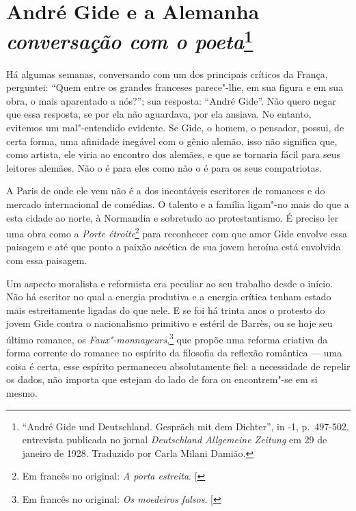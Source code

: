 \chapter*{André Gide e a Alemanha\\
\emph{conversação com o poeta}\footnote[*]{``André Gide und Deutschland. Gespräch mit dem Dichter'', in -1, p.~497-502, entrevista publicada no jornal \emph{Deutschland Allgemeine Zeitung} em 29 de janeiro de 1928. Traduzido por Carla Milani Damião.}}


Há algumas semanas, conversando com um dos principais críticos da
França, perguntei: ``Quem entre os grandes franceses parece"-lhe, em sua
figura e em sua obra, o mais aparentado a nós?''; sua resposta:
``André Gide''. Não quero negar que essa resposta, se por ela não
aguardava, por ela ansiava. No entanto, evitemos um mal"-entendido
evidente. Se Gide, o homem, o pensador, possui, de certa forma, uma
afinidade inegável com o gênio alemão, isso não significa que, como
artista, ele viria ao encontro dos alemães, e que se tornaria fácil para
seus leitores alemães. Não o é para eles como não o é para os seus
compatriotas.

A Paris de onde ele vem não é a dos incontáveis ​​escritores de romances
e do mercado internacional de comédias. O talento e a família ligam"-no
mais do que a esta cidade ao norte, à Normandia e sobretudo ao
protestantismo. É preciso ler uma obra como a \emph{Porte étroite}\footnote{Em francês no original: \emph{A porta estreita}. {[}\versal{N.~T.}{]}} para
reconhecer com que amor Gide envolve essa paisagem e até que ponto a
paixão ascética de sua jovem heroína está envolvida com essa paisagem.

Um aspecto moralista e reformista era peculiar ao seu trabalho desde o
início. Não há escritor no qual a energia produtiva e a energia crítica
tenham estado mais estreitamente ligadas do que nele. E se foi há trinta
anos o protesto do jovem Gide contra o nacionalismo primitivo e estéril
de Barrès, ou se hoje seu último romance, os \emph{Faux"-monnayeurs},\footnote{Em francês no original: \emph{Os moedeiros falsos}. {[}\versal{N.~T.}{]}}
que propõe uma reforma criativa da forma corrente do romance no
espírito da filosofia da reflexão romântica --- uma coisa é certa, esse
espírito permaneceu absolutamente fiel: a necessidade de repelir os
dados, não importa que estejam do lado de fora ou encontrem"-se em si
mesmo.

